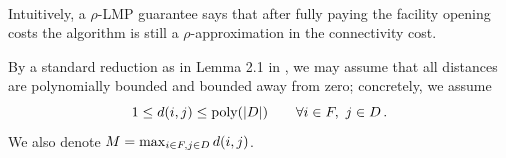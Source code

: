 \paragraph{}
Intuitively, a $\rho$-LMP guarantee says that after fully paying the facility opening costs the algorithm is still a $\rho$-approximation in the connectivity cost. 

\vspace{1em}
By a standard reduction as in Lemma 2.1 in \cite{MR4928455-Cohen25}, we may assume that all distances are polynomially bounded and bounded away from zero; concretely, we assume
\begin{equation}
\label{eq:dist-bound}
    1 \le d(i,j) \le \textnormal{poly}(|D|)
    \qquad \forall i \in F,\ j \in D\,.
\end{equation}
We also denote $M = \max_{i \in F, j \in D} d(i,j)$.



